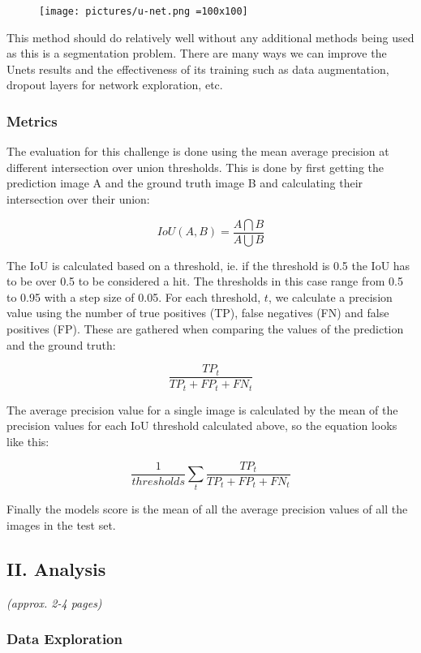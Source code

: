 \documentclass[11pt]{article}
\begin{document}
\begin{figure}
\centering
\texttt{[image: pictures/u-net.png =100x100]}
\caption{}
\end{figure}

This method should do relatively well without any additional methods
being used as this is a segmentation problem. There are many ways we can
improve the Unets results and the effectiveness of its training such as
data augmentation, dropout layers for network exploration, etc.

\subsubsection{Metrics}\label{metrics}

The evaluation for this challenge is done using the mean average
precision at different intersection over union thresholds. This is done
by first getting the prediction image A and the ground truth image B and
calculating their intersection over their union:

\[IoU(A, B) = \frac{A \bigcap B}{A \bigcup B}\]

The IoU is calculated based on a threshold, ie. if the threshold is 0.5
the IoU has to be over 0.5 to be considered a hit. The thresholds in
this case range from 0.5 to 0.95 with a step size of 0.05. For each
threshold, \(t\), we calculate a precision value using the number of
true positives (TP), false negatives (FN) and false positives (FP).
These are gathered when comparing the values of the prediction and the
ground truth:

\[\frac{TP_t}{TP_t + FP_t + FN_t}\]

The average precision value for a single image is calculated by the mean
of the precision values for each IoU threshold calculated above, so the
equation looks like this:

\[\frac{1}{thresholds}\sum_t\frac{TP_t}{TP_t + FP_t + FN_t}\]

Finally the models score is the mean of all the average precision values
of all the images in the test set.

\subsection{II. Analysis}\label{ii.-analysis}

\emph{(approx. 2-4 pages)}

\subsubsection{Data Exploration}\label{data-exploration}
\end{document}
